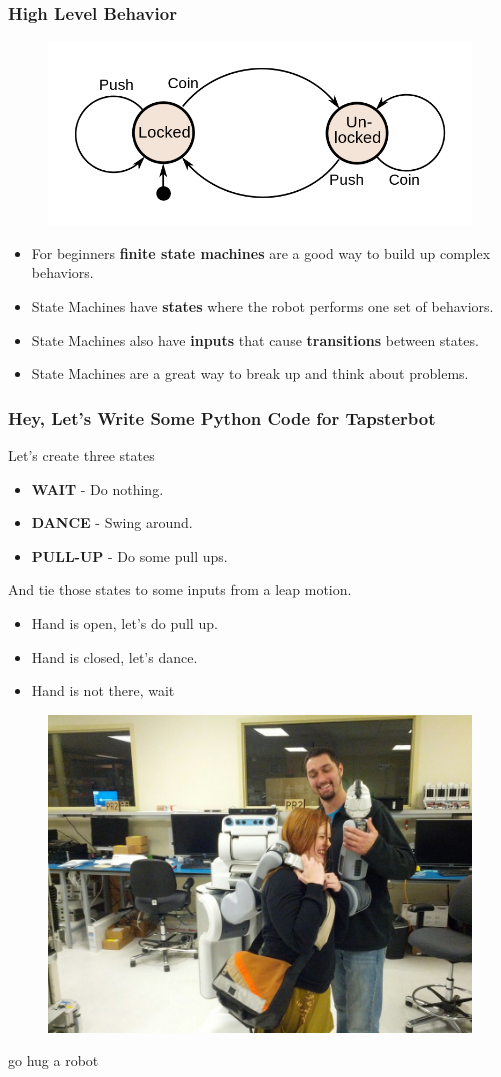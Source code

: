 \documentclass[compress]{beamer}
\begin{document}
\begin{frame}
  \frametitle{High Level Behavior}
  \begin{figure}
     \includegraphics[width=0.4\linewidth]{statemachine.png}
  \end{figure}
   \begin{itemize}
     \item For beginners \textbf{finite state machines} are a good way to build up complex behaviors. 
     \item State Machines have \textbf{states} where the robot performs one set of behaviors. 
    \item State Machines also have \textbf{inputs} that cause \textbf{transitions} between states. 
    \item State Machines are a great way to break up and think about problems.
   \end{itemize}     
 \end{frame}

\begin{frame}
  \frametitle{Hey, Let's Write Some Python Code for Tapsterbot}
  Let's create three states
  \begin{itemize}
  \item \textbf{WAIT} - Do nothing. 
  \item \textbf{DANCE} - Swing around.
  \item \textbf{PULL-UP} - Do some pull ups.
  \end{itemize}
  And tie those states to some inputs from a leap motion.
  \begin{itemize}
  \item Hand is open, let's do pull up.
  \item Hand is closed, let's dance. 
  \item Hand is not there, wait
  \end{itemize}
  
 \end{frame}



\begin{frame}
\begin{figure}
  \includegraphics[width=0.4\linewidth]{katpr2.jpg}
\end{figure}
\Huge{\centerline{go hug a robot}}
\end{frame}

\end{document}
